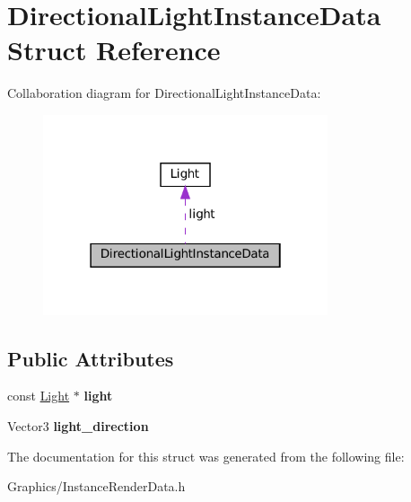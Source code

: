 \hypertarget{structDirectionalLightInstanceData}{}\section{Directional\+Light\+Instance\+Data Struct Reference}
\label{structDirectionalLightInstanceData}


Collaboration diagram for Directional\+Light\+Instance\+Data\+:\nopagebreak
\begin{figure}[H]
\begin{center}
\leavevmode
\includegraphics[width=238pt]{structDirectionalLightInstanceData__coll__graph}
\end{center}
\end{figure}
\subsection*{Public Attributes}
\begin{DoxyCompactItemize}
\item 
\mbox{\label{structDirectionalLightInstanceData_a07be794f18422b2d6698a37bf7d5d5bf}} 
const \hyperlink{classLight}{Light} $\ast$ {\bfseries light}
\item 
\mbox{\label{structDirectionalLightInstanceData_a5730d9b55f2190051d12deea1782b229}} 
Vector3 {\bfseries light\+\_\+direction}
\end{DoxyCompactItemize}


The documentation for this struct was generated from the following file\+:\begin{DoxyCompactItemize}
\item 
Graphics/Instance\+Render\+Data.\+h\end{DoxyCompactItemize}
